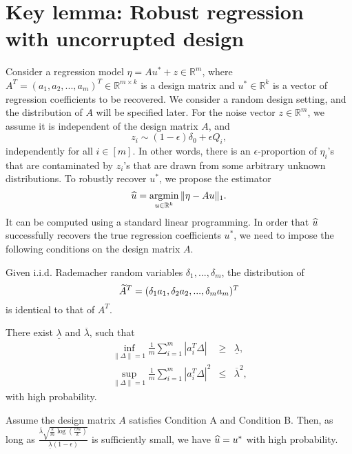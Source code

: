 


\section{Key lemma: Robust regression with uncorrupted design}
\label{sec:regression}

Consider a regression model $\eta=Au^*+z\in\mathbb{R}^m$, where $A^T=(a_1,a_2,...,a_m)^T\in\mathbb{R}^{m\times k}$ is a design matrix and $u^*\in\mathbb{R}^k$ is a vector of regression coefficients to be recovered. We consider a random design setting, and the distribution of $A$ will be specified later. For the noise vector $z\in\mathbb{R}^m$, we assume it is independent of the design matrix $A$, and
\begin{equation}
z_i\sim (1-\epsilon)\delta_0 + \epsilon Q_i, \label{eq:noise-add-con}
\end{equation}
independently for all $i\in[m]$. In other words, there is an $\epsilon$-proportion of $\eta_i$'s that are contaminated by $z_i$'s that are drawn from some arbitrary unknown distributions. To robustly recover $u^*$, we propose the estimator
$$\widehat{u}=\mathop{\rm argmin}_{u\in\mathbb{R}^k}\|\eta-Au\|_1.$$
It can be computed using a standard linear programming.
In order that $\widehat{u}$ successfully recovers the true regression coefficients $u^*$, we need to impose the following conditions on the design matrix $A$.
\begin{con1}
Given i.i.d. Rademacher random variables $\delta_1,...,\delta_m$, the distribution of
$$\widetilde{A}^T=(\delta_1a_1,\delta_2a_2,...,\delta_ma_m)^T$$
is identical to that of $A^T$.
\end{con1}
\begin{con2}
There exist $\underline{\lambda}$ and $\overline{\lambda}$, such that
\begin{eqnarray}
\label{eq:l1-upper-A} \inf_{\|\Delta\|=1}\frac{1}{m}\sum_{i=1}^m|a_i^T\Delta| &\geq& \underline{\lambda}, \\
\label{eq:l2-upper-A} \sup_{\|\Delta\|=1}\frac{1}{m}\sum_{i=1}^m|a_i^T\Delta|^2 &\leq& \overline{\lambda}^2,
\end{eqnarray}
with high probability.
\end{con2}
\begin{thm}\label{thm:robust-reg}
Assume the design matrix $A$ satisfies Condition A and Condition B. Then, as long as $\frac{\overline{\lambda}\sqrt{\frac{k}{m}\log\left(\frac{em}{k}\right)}}{\underline{\lambda}(1-\epsilon)}$ is sufficiently small, we have $\widehat{u}=u^*$ with high probability.
\end{thm}

